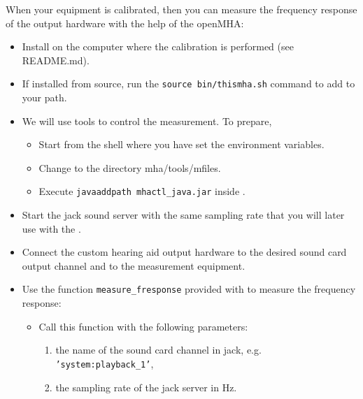\documentclass[11pt,a4paper,twoside]{article}
\newcommand{\+}{\discretionary{\mbox{\scriptsize$\hookleftarrow$}}{}{}}
\begin{document}
%

When your equipment is calibrated, then you can measure the frequency
response of the output hardware with the help of the openMHA:

\begin{itemize}
\item
  Install \mha{} on the computer where the calibration is performed (see README.md).
\item
  If installed from source, run the \texttt{source bin/thismha.sh}
  command to add \mha{} to your path.
\item
  We will use \Matlab{} tools to control the measurement. To prepare,
  \begin{itemize}
  \item Start \Matlab{} from the shell where you have set the \mha{} environment variables.
  \item Change to the directory mha/tools/mfiles.
  \item Execute \texttt{javaaddpath mhactl\_java.jar} inside \Matlab.
  \end{itemize}
\item
  Start the jack sound server with the same sampling rate that you
  will later use with the \mha{}.
\item
  Connect the custom hearing aid output hardware to the desired
  sound card output channel and to the measurement equipment.
\item
  Use the \Matlab{} function \texttt{measure\_fresponse} provided with
  \mha{} to measure the frequency response:
  \begin{itemize}
  \item Call this function with the following parameters:
    \begin{enumerate}
    \item the name of the sound card channel in jack,
      e.g. \texttt{'system:playback\_1'},
    \item the sampling rate of the jack server in Hz.
    \end{enumerate}

\end{itemize}
\end{itemize}
\end{document}
